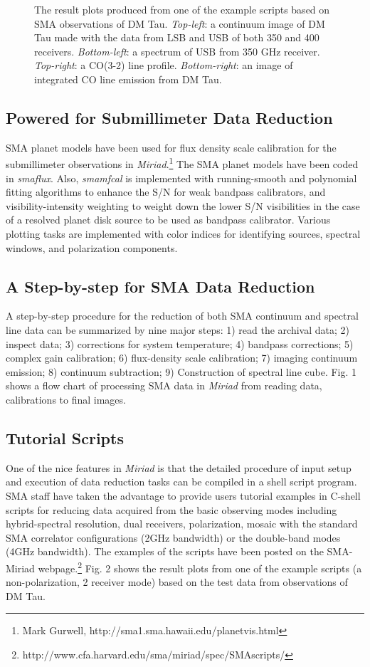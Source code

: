 \begin{figure}
\begin{minipage}{20pc}
\end{minipage}
\caption{The result plots produced from one of the example scripts 
based on SMA observations of DM Tau.
{\it Top-left}: a continuum image of DM Tau made with the data from LSB 
and USB of both 350 and 400 receivers.
{\it Bottom-left}: a spectrum of USB from 350 GHz receiver.
{\it Top-right}: a CO(3-2) line profile.
{\it Bottom-right}: an image of integrated CO line emission from DM Tau. }
\end{figure}


\subsection{Powered for Submillimeter Data Reduction}

SMA planet models have been used for flux density scale calibration 
for the submillimeter observations in {\it Miriad}.\footnote{Mark Gurwell, 
http://sma1.sma.hawaii.edu/planetvis.html}
The SMA planet models have been coded in {\it smaflux}.
Also,  {\it smamfcal} is implemented with 
running-smooth and polynomial fitting algorithms 
to enhance the S/N for weak bandpass calibrators, 
and visibility-intensity weighting to weight down 
the lower S/N visibilities in the case of a resolved 
planet disk source to be used as bandpass calibrator.
Various plotting tasks are implemented with color 
indices for identifying sources, spectral windows, and 
polarization components.

\subsection{A Step-by-step for SMA Data Reduction}
A step-by-step procedure for the reduction of both SMA continuum 
and spectral line data can be summarized by nine major steps: 
1) read the archival data; 
2) inspect data; 
3) corrections for system temperature; 
4) bandpass corrections; 
5) complex gain calibration; 
6) flux-density scale calibration; 
7) imaging continuum emission; 
8) continuum subtraction; 
9) Construction of spectral line cube. Fig. 1 shows a flow chart
of processing SMA data in {\it Miriad} from reading data, calibrations
to final images.

\subsection{Tutorial Scripts }
One of the nice features in {\it Miriad} is that the detailed 
procedure of input setup and execution of data reduction tasks 
can be compiled in a shell script program. SMA staff have taken 
the advantage to provide users tutorial examples in C-shell 
scripts for reducing data acquired from the basic observing 
modes including hybrid-spectral resolution, dual receivers, 
polarization, mosaic with the standard SMA correlator configurations 
(2GHz bandwidth) or the double-band modes (4GHz bandwidth). 
The examples of the scripts have been posted on the SMA-Miriad 
webpage.\footnote{http://www.cfa.harvard.edu/sma/miriad/spec/SMAscripts/}
Fig. 2 shows the result plots from one of the example scripts 
(a non-polarization, 2 receiver mode) based on the test data 
from observations of DM Tau.


